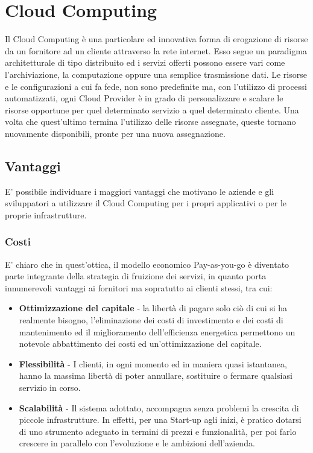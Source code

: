 \section{Cloud Computing}
Il Cloud Computing è una particolare ed innovativa forma di erogazione di risorse da un fornitore ad un cliente attraverso la rete internet. Esso segue un paradigma architetturale di tipo distribuito ed i servizi offerti possono essere vari come l'archiviazione, la computazione oppure una semplice trasmissione dati.
Le risorse e le configurazioni a cui fa fede, non sono predefinite ma, con l'utilizzo di processi automatizzati, ogni
 Cloud Provider è in grado di personalizzare e scalare le risorse opportune per quel determinato servizio a quel determinato cliente. Una volta che quest'ultimo termina l'utilizzo delle risorse assegnate, queste tornano nuovamente disponibili, pronte per una nuova assegnazione.

\subsection{Vantaggi}
E' possibile individuare i maggiori vantaggi che motivano le aziende e gli sviluppatori a utilizzare il Cloud Computing per i propri applicativi o per le proprie infrastrutture.
\subsubsection{Costi}
E' chiaro che in quest'ottica, il modello economico Pay-as-you-go è diventato parte integrante della strategia di fruizione dei servizi, in quanto porta innumerevoli vantaggi ai fornitori ma sopratutto ai clienti stessi, tra cui:
    \begin{itemize}
    \item \textbf{Ottimizzazione del capitale} - la libertà di pagare solo ciò di cui si ha realmente bisogno, l'eliminazione dei costi di investimento e dei costi di mantenimento ed il miglioramento dell'efficienza energetica permettono un notevole abbattimento dei costi ed un'ottimizzazione del capitale.
    \item \textbf{Flessibilità} - I clienti, in ogni momento ed in maniera quasi istantanea, hanno la massima libertà di poter annullare, sostituire o fermare qualsiasi servizio in corso.
    \item \textbf{Scalabilità} - Il sistema adottato, accompagna senza problemi la crescita di piccole infrastrutture. In effetti, per una Start-up agli inizi, è pratico dotarsi di uno strumento adeguato in termini di prezzi e funzionalità, per poi farlo crescere in parallelo con l'evoluzione e le ambizioni dell'azienda.
    \end{itemize}

